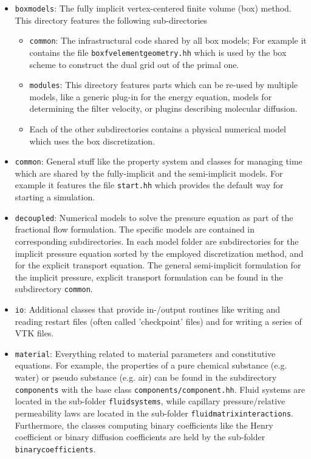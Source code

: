 \begin{itemize} 

\item \texttt{boxmodels}: The fully implicit vertex-centered finite
  volume (box) method. This directory features the following
  sub-directories
  \begin{itemize} 
  \item \texttt{common}: The infrastructural code shared by all box
    models; For example it contains the file
    \texttt{boxfvelementgeometry.hh} which is used by the box scheme to
    construct the dual grid out of the primal one.
  \item \texttt{modules}: This directory features parts which can be
    re-used by multiple models, like a generic plug-in for the energy
    equation, models for determining the filter velocity, or plugins
    describing molecular diffusion.
  \item Each of the other subdirectories contains 
    a physical numerical model which uses the box discretization.
  \end{itemize}

\item \texttt{common}: General stuff like the \eWoms property system
  and classes for managing time which are shared by the fully-implicit
  and the semi-implicit models.  For example it features the file
  \texttt{start.hh} which provides the default way for starting a
  simulation.

\item \texttt{decoupled}:
 Numerical models to solve the pressure equation as part of the fractional flow formulation. The specific models are contained 
 in corresponding subdirectories. In each model folder are subdirectories for the implicit pressure equation sorted by the employed discretization method, and for the explicit transport equation. The general semi-implicit formulation for the implicit pressure, explicit transport formulation can be found in the subdirectory \texttt{common}.

\item \texttt{io}: Additional classes that provide in-/output routines
  like writing and reading restart files (often called 'checkpoint'
  files) and for writing a series of VTK files.

\item \texttt{material}: Everything related to material parameters and
  constitutive equations. For example, the properties of a pure
  chemical substance (e.g. water) or pseudo substance (e.g. air) can
  be found in the subdirectory \texttt{components} with the base class
  \texttt{components/component.hh}. Fluid systems are located in the
  sub-folder \texttt{fluidsystems}, while capillary pressure/relative
  permeability laws are located in the sub-folder
  \texttt{fluidmatrixinteractions}. Furthermore, the classes computing
  binary coefficients like the Henry coefficient or binary diffusion
  coefficients are held by the sub-folder \texttt{binarycoefficients}.


\end{itemize}
